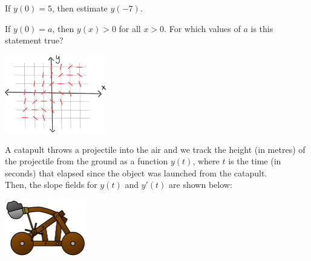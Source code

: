 \begin{minipage}{.75\textwidth}
\begin{parts}
	\item If $y(0)=5$, then estimate $y(-7)$.
	\item If $y(0)=a$, then $y(x)>0$ for all $x>0$. For which values of $a$ is this statement true?
\end{parts}
\end{minipage}
\hfill
\begin{minipage}{125pt}
	\includegraphics*[width=125pt]{images/module9-preclass.png}
\end{minipage}


\bookonlynewpage









\question
\begin{minipage}{.7\textwidth}
	A catapult throws a projectile into the air and we track the height (in metres) of the projectile from the ground as a function $y(t)$, where $t$ is the time (in seconds) that elapsed since the object was launched from the catapult. \\

	Then, the slope fields for $y(t)$ and $y'(t)$ are shown below:
\end{minipage}\hfill
\begin{minipage}{100pt}
	\includegraphics*[width=100pt]{images/module9-catapult.pdf}	
\end{minipage}



